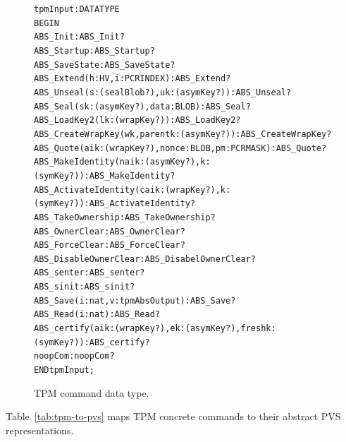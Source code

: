 \documentclass[10pt]{article}
\begin{document}
\begin{figure}
\begin{footnotesize}
\begin{alltt}
  tpmInput : DATATYPE
  BEGIN
    ABS_Init : ABS_Init? 
    ABS_Startup : ABS_Startup? %
    ABS_SaveState : ABS_SaveState? %
    ABS_Extend(h:HV,i:PCRINDEX) : ABS_Extend?
    ABS_Unseal(s:(sealBlob?),uk:(asymKey?)) : ABS_Unseal?   
    ABS_Seal(sk:(asymKey?),data:BLOB) : ABS_Seal?
    ABS_LoadKey2(lk:(wrapKey?)): ABS_LoadKey2? 
    ABS_CreateWrapKey(wk,parentk:(asymKey?)): ABS_CreateWrapKey?
    ABS_Quote(aik:(wrapKey?),nonce:BLOB,pm:PCRMASK) : ABS_Quote?
    ABS_MakeIdentity(naik:(asymKey?),k:(symKey?)) : ABS_MakeIdentity?
    ABS_ActivateIdentity(caik:(wrapKey?),k:(symKey?)) : ABS_ActivateIdentity?
    ABS_TakeOwnership : ABS_TakeOwnership?
    ABS_OwnerClear : ABS_OwnerClear? %
    ABS_ForceClear : ABS_ForceClear? %
    ABS_DisableOwnerClear : ABS_DisabelOwnerClear? %
    ABS_senter : ABS_senter? %
    ABS_sinit : ABS_sinit? %
    ABS_Save(i:nat,v:tpmAbsOutput) : ABS_Save?
    ABS_Read(i:nat) : ABS_Read?
    ABS_certify(aik:(wrapKey?),ek:(asymKey?),freshk:(symKey?)) : ABS_certify?
    noopCom : noopCom?
  END tpmInput;
\end{alltt}
\end{footnotesize}
\caption{TPM command data type.}
\label{fig:tpm-command}
\end{figure}

Table~\ref{tab:tpm-to-pvs} maps TPM concrete commands to their
abstract PVS representations.
\end{document}
